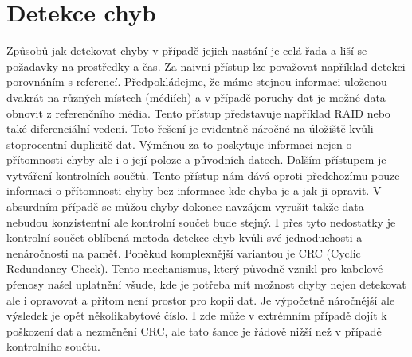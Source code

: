 \section{Detekce chyb}
\label{sec:errordetection}
Způsobů jak detekovat chyby v případě jejich nastání je celá řada a liší se požadavky na prostředky a čas. Za naivní přístup lze považovat například detekci porovnáním s referencí. Předpokládejme, že máme stejnou informaci uloženou dvakrát na různých místech (médiích) a v případě poruchy dat je možné data obnovit z referenčního média. Tento přístup představuje například RAID nebo také diferenciální vedení. Toto řešení je evidentně náročné na úložiště kvůli stoprocentní duplicitě dat. Výměnou za to poskytuje informaci nejen o přítomnosti chyby ale i o její poloze a původních datech. Dalším přístupem je vytváření kontrolních součtů. Tento přístup nám dává oproti předchozímu pouze informaci o přítomnosti chyby bez informace kde chyba je a jak ji opravit. V absurdním případě se můžou chyby dokonce navzájem vyrušit takže data nebudou konzistentní ale kontrolní součet bude stejný. I přes tyto nedostatky je kontrolní součet oblíbená metoda detekce chyb kvůli své jednoduchosti a nenáročnosti na paměť. Poněkud komplexnější variantou je CRC (Cyclic Redundancy Check). Tento mechanismus, který původně vznikl pro kabelové přenosy našel uplatnění všude, kde je potřeba mít možnost chyby nejen detekovat ale i opravovat a přitom není prostor pro kopii dat. Je výpočetně náročnější ale výsledek je opět několikabytové číslo. I zde může v extrémním případě dojít k poškození dat a nezměnění CRC, ale tato šance je řádově nižší než v případě kontrolního součtu.

